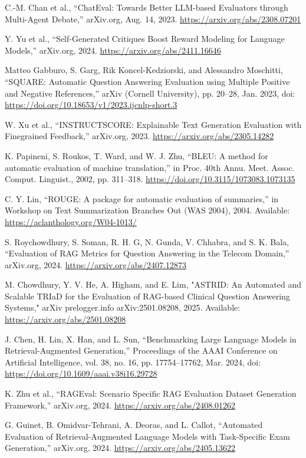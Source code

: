 \begin{thebibliography}{00}
 C.-M. Chan et al., “ChatEval: Towards Better LLM-based Evaluators through Multi-Agent Debate,” arXiv.org, Aug. 14, 2023. \url{https://arxiv.org/abs/2308.07201}

 Y. Yu et al., “Self-Generated Critiques Boost Reward Modeling for Language Models,” arXiv.org, 2024. \url{https://arxiv.org/abs/2411.16646}

 Matteo Gabburo, S. Garg, Rik Koncel-Kedziorski, and Alessandro Moschitti, “SQUARE: Automatic Question Answering Evaluation using Multiple Positive and Negative References,” arXiv (Cornell University), pp. 20–28, Jan. 2023, doi: \url{https://doi.org/10.18653/v1/2023.ijcnlp-short.3}

 W. Xu et al., “INSTRUCTSCORE: Explainable Text Generation Evaluation with Finegrained Feedback,” arXiv.org, 2023. \url{https://arxiv.org/abs/2305.14282}

 K. Papineni, S. Roukos, T. Ward, and W. J. Zhu, “BLEU: A method for automatic evaluation of machine translation,” in Proc. 40th Annu. Meet. Assoc. Comput. Linguist., 2002, pp. 311–318. \url{https://doi.org/10.3115/1073083.1073135}

 C. Y. Lin, “ROUGE: A package for automatic evaluation of summaries,” in Workshop on Text Summarization Branches Out (WAS 2004), 2004. Available: \url{https://aclanthology.org/W04-1013/}

 S. Roychowdhury, S. Soman, R. H. G, N. Gunda, V. Chhabra, and S. K. Bala, “Evaluation of RAG Metrics for Question Answering in the Telecom Domain,” arXiv.org, 2024. \url{https://arxiv.org/abs/2407.12873}

 M. Chowdhury, Y. V. He, A. Higham, and E. Lim, "ASTRID: An Automated and Scalable TRIaD for the Evaluation of RAG-based Clinical Question Answering Systems," arXiv prelogger.info arXiv:2501.08208, 2025.  Available: \url{https://arxiv.org/abs/2501.08208}

 J. Chen, H. Lin, X. Han, and L. Sun, “Benchmarking Large Language Models in Retrieval-Augmented Generation,” Proceedings of the AAAI Conference on Artificial Intelligence, vol. 38, no. 16, pp. 17754–17762, Mar. 2024, doi: \url{https://doi.org/10.1609/aaai.v38i16.29728}

 K. Zhu et al., “RAGEval: Scenario Specific RAG Evaluation Dataset Generation Framework,” arXiv.org, 2024. \url{https://arxiv.org/abs/2408.01262}

 G. Guinet, B. Omidvar-Tehrani, A. Deoras, and L. Callot, “Automated Evaluation of Retrieval-Augmented Language Models with Task-Specific Exam Generation,” arXiv.org, 2024. \url{https://arxiv.org/abs/2405.13622}


\end{thebibliography}

